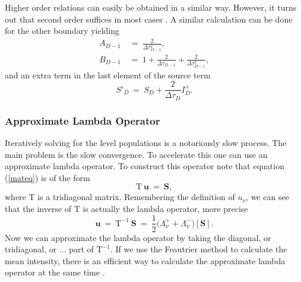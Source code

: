 \documentclass[]{article}
\begin{document}
Higher order relations can easily be obtained in a similar way. However, it turns out that second order suffices in most cases \cite{MihalasMihalas}. A similar calculation can be done for the other boundary yielding
\begin{equation}
\begin{split}
A_{D-1} \ &= \ \frac{2}{\Delta\tau_{D-1}^{2}}, \\
B_{D-1} \ &= \ 1 + \frac{2}{\Delta\tau_{D-1}} + \frac{2}{\Delta\tau_{D-1}^{2}},
\end{split}
\end{equation}
and an extra term in the last element of the source term
\begin{equation}
S'_{D}  \ = \  S_{D} + \frac{2}{\Delta\tau_{D}} I_{D}^{+}.
\end{equation}


\subsubsection{Approximate Lambda Operator}

Iteratively solving for the level populations is a notoriously slow process. The main problem is the slow convergence. To accelerate this one can use an approximate lambda operator. To construct this operator note that equation (\ref{mateq}) is of the form
\begin{equation}
\text{T} \ \textbf{u} \ = \ \textbf{S},
\end{equation}
where T is a tridiagonal matrix. Remembering the definition of  $u_{\nu}$, we can see that the inverse of T is actually the lambda operator, more precise
\begin{equation}
\textbf{u} \ = \ \text{T}^{-1} \ \textbf{S} \ = \ \frac{1}{2}\big(\Lambda^{+}_{\nu} + \Lambda^{-}_{\nu} \big) [\textbf{S}].
\end{equation}
Now we can approximate the lambda operator by taking the diagonal, or tridiagonal, or ... part of $\text{T}^{-1}$. If we use the Feautrier method to calculate the mean intensity, there is an efficient way to calculate the approximate lambda operator at the same time \cite{Rybicki1991}.

\bigskip
\end{document}
